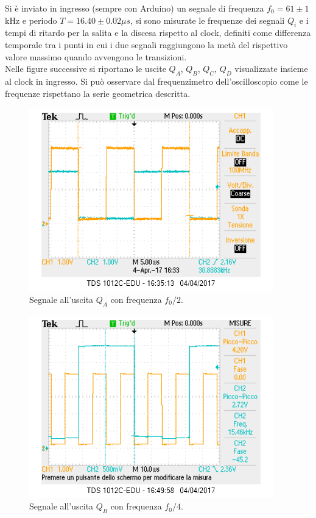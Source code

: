 \documentclass[10pt,a4paper]{article}
\begin{document}
Si è inviato in ingresso (sempre con Arduino) un segnale di frequenza $f_0 = 61 \pm 1$kHz e periodo $T = 16.40 \pm 0.02 \mu s$, si sono misurate le frequenze dei segnali $Q_i$ e i tempi di ritardo per la salita e la discesa rispetto al clock, definiti come differenza temporale tra i punti in cui i due segnali raggiungono la metà del rispettivo valore massimo quando avvengono le transizioni.\\

Nelle figure successive si riportano le uscite $Q_A$, $Q_B$, $Q_C$, $Q_D$ visualizzate insieme al clock in ingresso. Si può osservare dal frequenzimetro dell'oscilloscopio come le frequenze rispettano la serie geometrica descritta.\\

\begin{figure}
\centering
\includegraphics[scale=1.0]{QA1-2.png}
\caption{Segnale all'uscita $Q_A$ con frequenza $f_0/2$.\label{freq2}}
\end{figure}

\begin{figure}
\centering
\includegraphics[scale=1.0]{QB1-4.png}
\caption{Segnale all'uscita $Q_B$ con frequenza $f_0/4$.\label{freq4}}
\end{figure}
\end{document}
